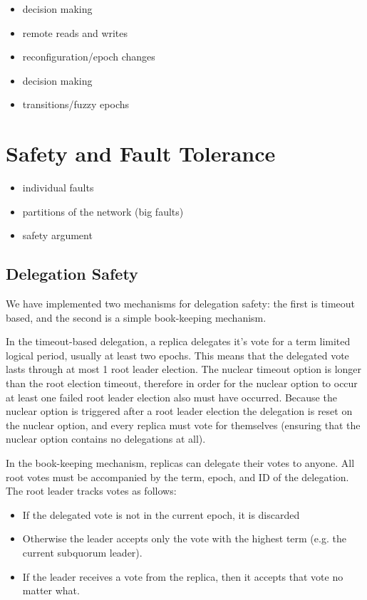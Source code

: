\documentclass[10pt,twocolumn]{article}
\begin{document}
\begin{itemize}
    \item \sub decision making
    \item remote reads and writes
    \item reconfiguration/epoch changes
    \item \roo decision making
    \item transitions/fuzzy epochs
\end{itemize}

\section*{Safety and Fault Tolerance}

\begin{itemize}
    \item individual faults
    \item partitions of the network (big faults)
    \item safety argument
\end{itemize}

\subsection*{Delegation Safety}

We have implemented two mechanisms for delegation safety: the first is
timeout based, and the second is a simple book-keeping mechanism.

In the timeout-based delegation, a replica delegates it's vote for a term
limited logical period, usually at least two epochs. This means that the
delegated vote lasts through at most 1 root leader election. The nuclear
timeout option is longer than the root election timeout, therefore in order
for the nuclear option to occur at least one failed root leader election also
must have occurred. Because the nuclear option is triggered after a root
leader election the delegation is reset on the nuclear option, and every
replica must vote for themselves (ensuring that the nuclear option contains
no delegations at all).

 In
the book-keeping mechanism, replicas can delegate their votes to anyone. All
root votes must be accompanied by the term, epoch, and ID of the delegation.
The root leader tracks votes as follows:

\begin{itemize}
\item If the delegated vote is not in the current epoch, it is discarded
\item Otherwise the leader accepts only the vote with the highest term (e.g.
the current subquorum leader).
\item If the leader receives a vote from the replica, then it accepts that
vote no matter what.
\end{itemize}
\end{document}

